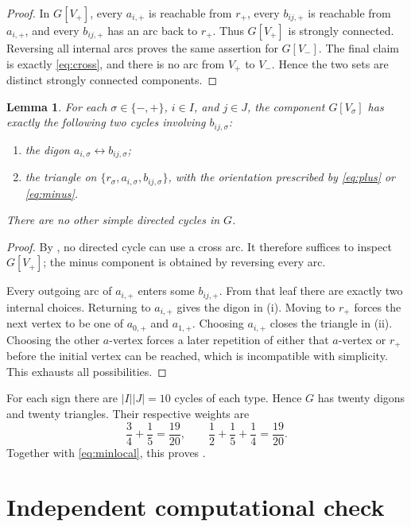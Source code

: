 \documentclass[10pt,reqno]{amsart}
\newtheorem{lemma}[theorem]{Lemma}
\theoremstyle{definition}
\begin{document}
\begin{proof}
In $G[V_+]$, every $a_{i,+}$ is reachable from $r_+$, every $b_{ij,+}$ is reachable from $a_{i,+}$, and every $b_{ij,+}$ has an arc back to $r_+$. Thus $G[V_+]$ is strongly connected. Reversing all internal arcs proves the same assertion for $G[V_-]$. The final claim is exactly \eqref{eq:cross}, and there is no arc from $V_+$ to $V_-$. Hence the two sets are distinct strongly connected components.
\end{proof}

\begin{lemma}\label{lem:cycles}
For each $\sigma\in\{-,+\}$, $i\in I$, and $j\in J$, the component $G[V_\sigma]$ has exactly the following two cycles involving $b_{ij,\sigma}$:
\begin{enumerate}[label=\textup{(\roman*)}]
  \item the digon $a_{i,\sigma}\leftrightarrow b_{ij,\sigma}$;
  \item the triangle on $\{r_\sigma,a_{i,\sigma},b_{ij,\sigma}\}$, with the orientation prescribed by \eqref{eq:plus} or \eqref{eq:minus}.
\end{enumerate}
There are no other simple directed cycles in $G$.
\end{lemma}

\begin{proof}
By , no directed cycle can use a cross arc. It therefore suffices to inspect $G[V_+]$; the minus component is obtained by reversing every arc.

Every outgoing arc of $a_{i,+}$ enters some $b_{ij,+}$. From that leaf there are exactly two internal choices. Returning to $a_{i,+}$ gives the digon in (i). Moving to $r_+$ forces the next vertex to be one of $a_{0,+}$ and $a_{1,+}$. Choosing $a_{i,+}$ closes the triangle in (ii). Choosing the other $a$-vertex forces a later repetition of either that $a$-vertex or $r_+$ before the initial vertex can be reached, which is incompatible with simplicity. This exhausts all possibilities.
\end{proof}

For each sign there are $|I||J|=10$ cycles of each type. Hence $G$ has twenty digons and twenty triangles. Their respective weights are
\[
  \frac34+\frac15=\frac{19}{20},
  \qquad
  \frac12+\frac15+\frac14=\frac{19}{20}.
\]
Together with \eqref{eq:minlocal}, this proves .

\section{Independent computational check}
\end{document}
